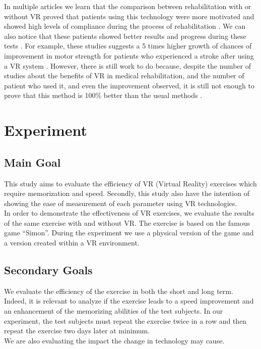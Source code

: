 \documentclass[12pt, openany, twocolumn]{article}
\begin{document}
In multiple articles we learn that the comparison between rehabilitation with or without VR proved that patients using this technology were more motivated and showed high levels of compliance during the process of rehabilitation \cite{sampaioDoesVirtualRealitybased2016, chenProgressSensorimotorRehabilitative2014}.
We can also notice that these patients showed better results and progress during these tests \cite{corbettaRehabilitationThatIncorporates2015, saposnikEffectivenessVirtualReality2010, chenProgressSensorimotorRehabilitative2014, saposnikgustavoVirtualRealityStroke2011}.
For example, these studies suggests a 5 times higher growth of chances of improvement in motor strength for patients who experienced a stroke after using a VR system \cite{saposnikgustavoVirtualRealityStroke2011}.
However, there is still work to do because, despite the number of studies about the benefits of VR in medical rehabilitation, and the number of patient who used it, and even the improvement observed, it is still not enough to prove that this method is 100\% better than the usual methods \cite{saposnikEffectivenessVirtualReality2010, saposnikgustavoVirtualRealityStroke2011, luque-morenoDecadeProgressUsing2015}.

\section{Experiment}
    \subsection{Main Goal}
    This study aims to evaluate the efficiency of VR (Virtual Reality) exercises which require memorization and speed.
    Secondly, this study also have the intention of showing the ease of measurement of each parameter using VR technologies.
    \\

    In order to demonstrate the effectiveness of VR exercises, we evaluate the results of the same exercise with and without VR. The exercise is based on the famous game “Simon”. 
    During the experiment we use a physical version of the game and a version created within a VR environment.

    \subsection{Secondary Goals}
    We evaluate the efficiency of the exercise in both the short and long term.
    Indeed, it is relevant to analyze if the exercise leads to a speed improvement and an enhancement of the memorizing abilities of the test subjects.
    In our experiment, the test subjects must repeat the exercise twice in a row and then repeat the exercise two days later at minimum. \\
    We are also evaluating the impact the change in technology may cause.
    \\
\end{document}
